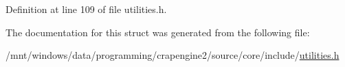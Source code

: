 Definition at line 109 of file utilities.\+h.



The documentation for this struct was generated from the following file\+:\begin{DoxyCompactItemize}
\item 
/mnt/windows/data/programming/crapengine2/source/core/include/\hyperlink{utilities_8h}{utilities.\+h}\end{DoxyCompactItemize}
